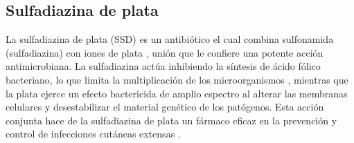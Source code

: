 \documentclass[../../DocumentoCompleto.tex]{subfiles}
\begin{document}
  \subsection{Sulfadiazina de plata}
La sulfadiazina de plata (SSD) es un antibiótico el cual combina sulfonamida (sulfadiazina) con iones de plata \cite{Nunes2023}, unión que le confiere una potente acción antimicrobiana. La sulfadiazina actúa inhibiendo la síntesis de ácido fólico bacteriano, lo que limita la multiplicación de los microorganismos \cite{Fatima2022}, mientras que la plata ejerce un efecto bactericida de amplio espectro al alterar las membranas celulares y desestabilizar el material genético de los patógenos. Esta acción conjunta hace de la sulfadiazina de plata un fármaco eficaz en la prevención y control de infecciones cutáneas extensas \cite{DeFrancesco2022}.
\end{document}
